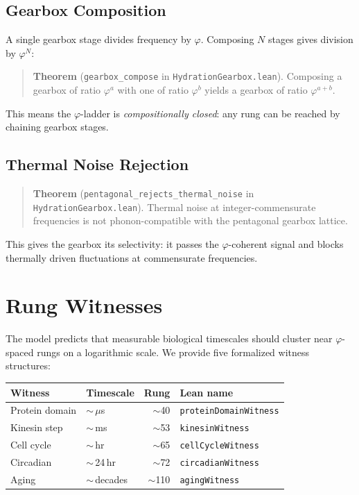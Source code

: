 \documentclass[11pt,twocolumn]{article}
\begin{document}
\subsection{Gearbox Composition}

A single gearbox stage divides frequency by $\varphi$. Composing $N$
stages gives division by $\varphi^N$:

\begin{quote}
\textbf{Theorem} (\texttt{gearbox\_compose} in
\texttt{HydrationGearbox.lean}).
Composing a gearbox of ratio $\varphi^a$ with one of ratio $\varphi^b$
yields a gearbox of ratio $\varphi^{a+b}$.
\end{quote}

This means the $\varphi$-ladder is \emph{compositionally closed}: any
rung can be reached by chaining gearbox stages.

\subsection{Thermal Noise Rejection}

\begin{quote}
\textbf{Theorem} (\texttt{pentagonal\_rejects\_thermal\_noise} in
\texttt{HydrationGearbox.lean}).
Thermal noise at integer-commensurate frequencies is not phonon-compatible
with the pentagonal gearbox lattice.
\end{quote}

This gives the gearbox its selectivity: it passes the $\varphi$-coherent
signal and blocks thermally driven fluctuations at commensurate
frequencies.

\section{Rung Witnesses}

The model predicts that measurable biological timescales should cluster
near $\varphi$-spaced rungs on a logarithmic scale. We provide five
formalized witness structures:

\begin{center}
\small
\begin{tabular}{@{}llrl@{}}
\toprule
Witness & Timescale & Rung & Lean name \\
\midrule
Protein domain & $\sim$\,$\mu$s & $\sim$40 & \texttt{proteinDomainWitness} \\
Kinesin step & $\sim$\,ms & $\sim$53 & \texttt{kinesinWitness} \\
Cell cycle & $\sim$\,hr & $\sim$65 & \texttt{cellCycleWitness} \\
Circadian & $\sim$\,24\,hr & $\sim$72 & \texttt{circadianWitness} \\
Aging & $\sim$\,decades & $\sim$110 & \texttt{agingWitness} \\
\bottomrule
\end{tabular}
\end{center}
\end{document}
